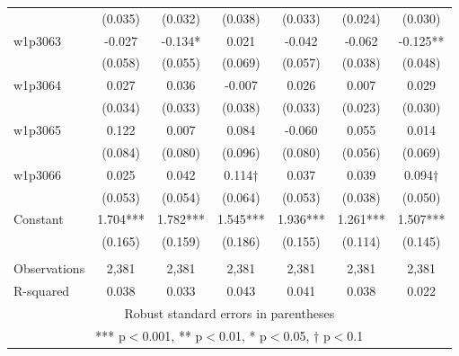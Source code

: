 \documentclass[]{article}
\begin{document}
\begin{tabular}{lcccccc}
 & (0.035) & (0.032) & (0.038) & (0.033) & (0.024) & (0.030) \\
w1p3063 & -0.027 & -0.134* & 0.021 & -0.042 & -0.062 & -0.125** \\
 & (0.058) & (0.055) & (0.069) & (0.057) & (0.038) & (0.048) \\
w1p3064 & 0.027 & 0.036 & -0.007 & 0.026 & 0.007 & 0.029 \\
 & (0.034) & (0.033) & (0.038) & (0.033) & (0.023) & (0.030) \\
w1p3065 & 0.122 & 0.007 & 0.084 & -0.060 & 0.055 & 0.014 \\
 & (0.084) & (0.080) & (0.096) & (0.080) & (0.056) & (0.069) \\
w1p3066 & 0.025 & 0.042 & 0.114† & 0.037 & 0.039 & 0.094† \\
 & (0.053) & (0.054) & (0.064) & (0.053) & (0.038) & (0.050) \\
Constant & 1.704*** & 1.782*** & 1.545*** & 1.936*** & 1.261*** & 1.507*** \\
 & (0.165) & (0.159) & (0.186) & (0.155) & (0.114) & (0.145) \\
 &  &  &  &  &  &  \\
Observations & 2,381 & 2,381 & 2,381 & 2,381 & 2,381 & 2,381 \\
 R-squared & 0.038 & 0.033 & 0.043 & 0.041 & 0.038 & 0.022 \\ \hline
\multicolumn{7}{c}{ Robust standard errors in parentheses} \\
\multicolumn{7}{c}{ *** p$<$0.001, ** p$<$0.01, * p$<$0.05, † p$<$0.1} \\
\end{tabular}
\end{document}
